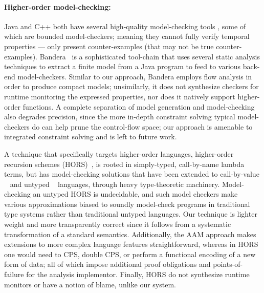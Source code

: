 \paragraph{Higher-order model-checking:}
Java and C++ both have several high-quality model-checking tools \citep{ianjohnson:bandera, ianjohnson:java-pathfinder, ianjohnson:LLBMC}, some of which are bounded model-checkers; meaning they cannot fully verify temporal properties --- only present counter-examples (that may not be true counter-examples).
%
Bandera~\citep{ianjohnson:bandera} is a sophisticated tool-chain that uses several static analysis techniques to extract a finite model from a Java program to feed to various back-end model-checkers.
%
Similar to our approach, Bandera employs flow analysis in order to produce compact models; unsimilarly, it does not synthesize checkers for runtime monitoring the expressed properties, nor does it natively support higher-order functions.
%
A complete separation of model generation and model-checking also degrades precision, since the more in-depth constraint solving typical model-checkers do can help prune the control-flow space; our approach is amenable to integrated constraint solving and is left to future work.

A technique that specifically targets higher-order languages, higher-order recursion schemes (HORS)~\citep{ianjohnson:Knapik:2002:HPT:646794.704852}, is rooted in simply-typed, call-by-name lambda terms, but has model-checking solutions that have been extended to call-by-value ~\citep{?} and untyped ~\citep{?} languages, through heavy type-theoretic machinery.
%
Model-checking an untyped HORS is undecidable, and such model checkers make various approximations biased to soundly model-check programs in traditional type systems rather than traditional untyped languages.
%
Our technique is lighter weight and more transparently correct since it follows from a systematic transformation of a standard semantics.
%
Additionally, the AAM approach makes extensions to more complex language features straightforward, whereas in HORS one would need to CPS, double CPS, or perform a functional encoding of a new form of data; all of which impose additional proof obligations and points-of-failure for the analysis implementor.
%
Finally, HORS do not synthesize runtime monitors or have a notion of blame, unlike our system.


